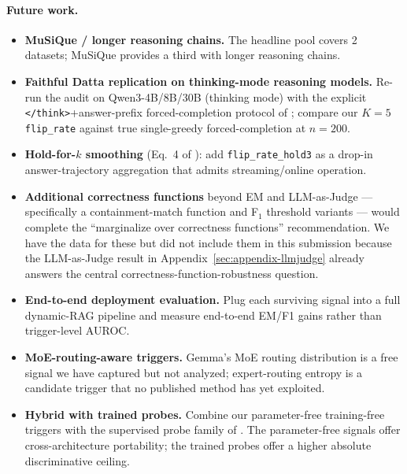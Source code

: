 \documentclass[11pt]{article}
\begin{document}
\paragraph{Future work.}
\begin{itemize}
\item \textbf{MuSiQue / longer reasoning chains.} The headline
pool covers 2 datasets; MuSiQue \citep{Trivedi_MuSiQue} provides a third with
longer reasoning chains.
\item \textbf{Faithful Datta replication on thinking-mode reasoning models.}
Re-run the audit on Qwen3-4B/8B/30B (thinking mode) with the explicit
\texttt{</think>}+answer-prefix forced-completion protocol of
\citep{Datta_DecideEarlyExplainLater}; compare our $K{=}5$
\texttt{flip\_rate} against true single-greedy forced-completion at $n{=}200$.
\item \textbf{Hold-for-$k$ smoothing} (Eq.~4 of
\citealp{Datta_DecideEarlyExplainLater}): add \texttt{flip\_rate\_hold3} as a
drop-in answer-trajectory aggregation that admits streaming/online operation.

\item \textbf{Additional correctness functions} beyond EM and
LLM-as-Judge --- specifically a containment-match function and F$_1$
threshold variants --- would complete the
\citet{Ielanskyi_PitfallsUQEvaluationNLG} ``marginalize over correctness
functions'' recommendation. We have the data for these but did not
include them in this submission because the LLM-as-Judge result in
Appendix~\ref{sec:appendix-llmjudge} already answers the central
correctness-function-robustness question.

\item \textbf{End-to-end deployment evaluation.} Plug each surviving signal
into a full dynamic-RAG pipeline and measure end-to-end EM/F1 gains rather
than trigger-level AUROC.
\item \textbf{MoE-routing-aware triggers.} Gemma's MoE routing distribution
is a free signal we have captured but not analyzed; expert-routing entropy
\citep[unpublished schema field N1]{} is a candidate trigger that no
published method has yet exploited.
\item \textbf{Hybrid with trained probes.} Combine our parameter-free
training-free triggers with the supervised probe family of
\citep{Lu_StreamingHallucinationDetectionCoT,
Liu_CtrlA, Zhang_AnswerAgreementRepresentationShaping}. The parameter-free
signals offer cross-architecture portability; the trained probes offer a
higher absolute discriminative ceiling.
\end{itemize}
\end{document}
